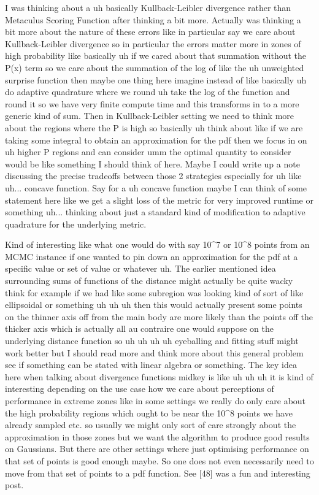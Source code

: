 I was thinking about a uh basically Kullback-Leibler divergence rather than Metaculus Scoring Function after thinking a bit more. Actually was thinking a bit more about the nature of these errors like in particular say we care about Kullback-Leibler divergence so in particular the errors matter more in zones of high probability like basically uh if we cared about that summation without the P(x) term so we care about the summation of the log of like the uh unweighted surprise function then maybe one thing here imagine instead of like basically uh do adaptive quadrature where we round uh take the log of the function and round it so we have very finite compute time and this transforms in to a more generic kind of sum. Then in Kullback-Leibler setting we need to think more about the regions where the P is high so basically uh think about like if we are taking some integral to obtain an approximation for the pdf then we focus in on uh higher P regions and can consider umm the optimal quantity to consider would be like something I should think of here. Maybe I could write up a note discussing the precise tradeoffs between those 2 strategies especially for uh like uh... concave function. Say for a uh concave function maybe I can think of some statement here like we get a slight loss of the metric for very improved runtime or something uh... thinking about just a standard kind of modification to adaptive quadrature for the underlying metric.

Kind of interesting like what one would do with say 10^7 or 10^8 points from an MCMC instance if one wanted to pin down an approximation for the pdf at a specific value or set of value or whatever uh. The earlier mentioned idea surrounding sums of functions of the distance might actually be quite wacky think for example if we had like some subregion was looking kind of sort of like ellipsoidal or something uh uh uh then this would actually present some points on the thinner axis off from the main body are more likely than the points off the thicker axis which is actually all au contraire one would suppose on the underlying distance function so uh uh uh uh eyeballing and fitting stuff might work better but I should read more and think more about this general problem see if something can be stated with linear algebra or something. The key idea here when talking about divergence functions midkey is like uh uh uh it is kind of interesting depending on the use case how we care about perceptions of performance in extreme zones like in some settings we really do only care about the high probability regions which ought to be near the 10^8 points we have already sampled etc. so usually we might only sort of care strongly about the approximation in those zones but we want the algorithm to produce good results on Gaussians. But there are other settings where just optimising performance on that set of points is good enough maybe. So one does not even necessarily need to move from that set of points to a pdf function. See [48] was a fun and interesting post.

